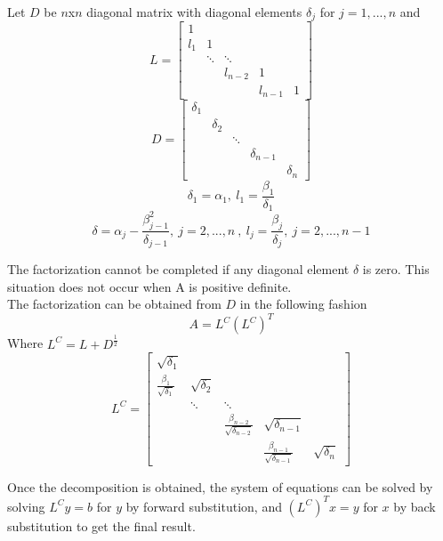 \documentclass[12pt]{article}
\begin{document}
Let $D$ be $n$x$n$ diagonal matrix with diagonal elements $\delta_j$ for $j = 1,...,n$ and
$$
L= \left[
\begin{array}{ccccc}
1 &  &  & & \\
l_1 & 1 &   & & \\
  &\ddots&\ddots& &  \\
 &  & l_{n-2} & 1 &  \\
  &  &   & l_{n-1} & 1
\end{array}
\right]
$$
$$
D= \left[
\begin{array}{ccccc}
\delta_1 &  &  & & \\
 & \delta_2 &   & & \\
  & &\ddots& &  \\
 &  &  & \delta_{n-1} &  \\
  &  &   &  & \delta_n
\end{array}
\right]
$$
$$\delta_1=\alpha_1, \ l_1=\frac{\beta_1}{\delta_1}$$
$$\delta=\alpha_j-\frac{\beta_{j-1}^2}{\delta_{j-1}},\ j=2,...,n\ ,\ l_j=\frac{\beta_j}{\delta_j},\ j=2,...,n-1$$

The factorization cannot be completed if any diagonal element $\delta$ is zero. This situation does not occur when A is positive definite.\\

The factorization can be obtained from $D$ in the following fashion
$$
A = L^C(L^C)^T
$$
Where $L^C=L+D^{\frac{1}{2}}$
$$
L^C = \left[
\begin{array}{ccccc}
\sqrt{\delta_1} &  &  & & \\
\frac{\beta_1}{\sqrt{\delta_1}} & \sqrt{\delta_2} &   & & \\
  &\ddots&\ddots& &  \\
 &  & \frac{\beta_{n-2}}{\sqrt{\delta_{n-2}}} & \sqrt{\delta_{n-1}} &  \\
  &  &   & \frac{\beta_{n-1}}{\sqrt{\delta_{n-1}}} & \sqrt{\delta_n}
\end{array}
\right]
$$

Once the decomposition is obtained, the system of equations can be solved by solving $L^Cy=b$ for $y$ by forward substitution, and $(L^C)^Tx=y$ for $x$ by back substitution to get the final result.                  
\end{document}
